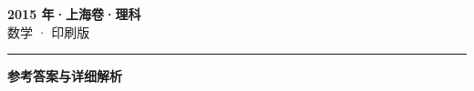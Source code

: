 \documentclass[zihao=5, a4paper]{ctexart}
\begin{document}
\begin{center}
  {\Large\bfseries 2015 年·上海卷·理科}\\[4pt]
  {\large 数学 · 印刷版}
\end{center}
\medskip
{}

\par\bigskip\hrule\bigskip
{}
\begin{center}{\large\bfseries 参考答案与详细解析}\end{center}
\smallskip

\end{document}
